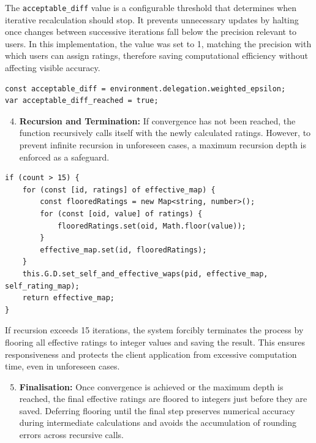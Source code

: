 The \texttt{acceptable\_diff} value is a configurable threshold that determines when iterative recalculation should stop. It prevents unnecessary updates by halting once changes between successive iterations fall below the precision relevant to users. In this implementation, the value was set to 1, matching the precision with which users can assign ratings, therefore saving computational efficiency without affecting visible accuracy.

\begin{verbatim}
const acceptable_diff = environment.delegation.weighted_epsilon;
var acceptable_diff_reached = true;
\end{verbatim}

\begin{enumerate}
    \setcounter{enumi}{3}
    \item \textbf{Recursion and Termination:} If convergence has not been reached, the function recursively calls itself with the newly calculated ratings. However, to prevent infinite recursion in unforeseen cases, a maximum recursion depth is enforced as a safeguard.
\end{enumerate}

\begin{verbatim}
if (count > 15) {
    for (const [id, ratings] of effective_map) {
        const flooredRatings = new Map<string, number>();
        for (const [oid, value] of ratings) {
            flooredRatings.set(oid, Math.floor(value));
        }
        effective_map.set(id, flooredRatings);
    }
    this.G.D.set_self_and_effective_waps(pid, effective_map, self_rating_map);
    return effective_map;
}
\end{verbatim}

If recursion exceeds 15 iterations, the system forcibly terminates the process by flooring all effective ratings to integer values and saving the result. This ensures responsiveness and protects the client application from excessive computation time, even in unforeseen cases.

\begin{enumerate}
    \setcounter{enumi}{4}
    \item \textbf{Finalisation:} Once convergence is achieved or the maximum depth is reached, the final effective ratings are floored to integers just before they are saved. Deferring flooring until the final step preserves numerical accuracy during intermediate calculations and avoids the accumulation of rounding errors across recursive calls.
\end{enumerate}

